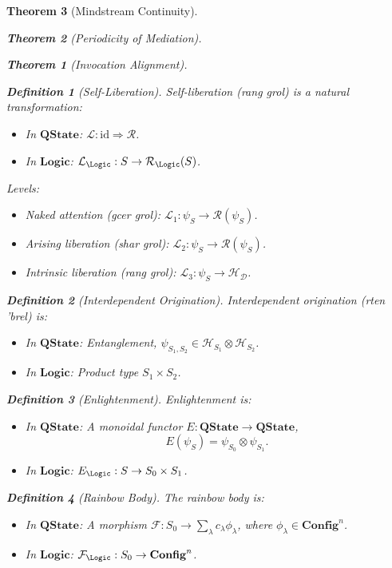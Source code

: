 \documentclass{article}
\newtheorem{theorem}{Theorem}[section]
\newtheorem{definition}{Definition}[section]
\begin{document}
\begin{theorem}[Mindstream Continuity]
\begin{theorem}[Periodicity of Mediation]
\begin{theorem}[Invocation Alignment]
\begin{definition}[Self-Liberation]
Self-liberation (\textit{rang grol}) is a natural transformation:
\begin{itemize}
    \item In \(\mathbf{QState}\): \(\mathcal{L}: \text{id} \Rightarrow \mathcal{R}\).
    \item In \(\mathbf{Logic}\): \(\mathcal{L}_\Logic: S \to \mathcal{R}_\Logic(S)\).
\end{itemize}
Levels:
\begin{itemize}
    \item Naked attention (\textit{gcer grol}): \(\mathcal{L}_1: \psi_S \to \mathcal{R}(\psi_S)\).
    \item Arising liberation (\textit{shar grol}): \(\mathcal{L}_2: \psi_S \to \mathcal{R}(\psi_S)\).
    \item Intrinsic liberation (\textit{rang grol}): \(\mathcal{L}_3: \psi_S \to \mathcal{H}_{\mathcal{D}}\).
\end{itemize}
\end{definition}

\begin{definition}[Interdependent Origination]
Interdependent origination (\textit{rten 'brel}) is:
\begin{itemize}
    \item In \(\mathbf{QState}\): Entanglement, \(\psi_{S_1, S_2} \in \mathcal{H}_{S_1} \otimes \mathcal{H}_{S_2}\).
    \item In \(\mathbf{Logic}\): Product type \(S_1 \times S_2\).
\end{itemize}
\end{definition}

\begin{definition}[Enlightenment]
Enlightenment is:
\begin{itemize}
    \item In \(\mathbf{QState}\): A monoidal functor \(E: \mathbf{QState} \to \mathbf{QState}\),
    \[
    E(\psi_S) = \psi_{S_0} \otimes \psi_{S_1}.
    \]
    \item In \(\mathbf{Logic}\): \(E_\Logic: S \to S_0 \times S_1\).
\end{itemize}
\end{definition}

\begin{definition}[Rainbow Body]
The rainbow body is:
\begin{itemize}
    \item In \(\mathbf{QState}\): A morphism \(\mathcal{F}: S_0 \to \sum_\lambda c_\lambda \phi_\lambda\), where \(\phi_\lambda \in \mathbf{Config}^n\).
    \item In \(\mathbf{Logic}\): \(\mathcal{F}_\Logic: S_0 \to \mathbf{Config}^n\).
\end{itemize}
\end{definition}


\end{theorem}
\end{theorem}
\end{theorem}
\end{document}
